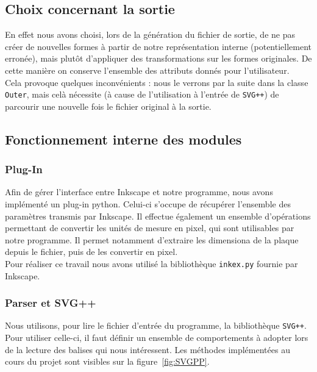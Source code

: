 \subsection{Choix concernant la sortie}

En effet nous avons choisi, lors de la génération du fichier de sortie, de ne pas créer de nouvelles formes à partir de notre représentation interne (potentiellement erronée), mais plutôt d'appliquer des transformations sur les formes originales. De cette manière on conserve l'ensemble des attributs donnés pour l'utilisateur.\\

Cela provoque quelques inconvénients : nous le verrons par la suite dans la classe \texttt{Outer}, mais celà nécessite (à cause de l'utilisation à l'entrée de \texttt{SVG++}) de parcourir une nouvelle fois le fichier original à la sortie.

\subsection{Fonctionnement interne des modules}

\subsubsection{Plug-In}

Afin de gérer l'interface entre Inkscape et notre programme, nous avons implémenté un plug-in python.
Celui-ci s'occupe de récupérer l'ensemble des paramètres transmis par Inkscape. Il effectue également un ensemble d'opérations permettant de convertir les unités de mesure en pixel, qui sont utilisables par notre programme. Il permet notamment d'extraire les dimensiona de la plaque depuis le fichier, puis de les convertir en pixel.\\
Pour réaliser ce travail nous avons utilisé la bibliothèque \texttt{inkex.py} fournie par Inkscape.\\



\subsubsection{Parser et SVG++}
Nous utilisons, pour lire le fichier d'entrée du programme, la bibliothèque \texttt{SVG++}.
Pour utiliser celle-ci, il faut définir un ensemble de comportements à adopter lors de la lecture des balises qui nous intéressent. Les méthodes implémentées au cours du projet sont visibles sur la figure~\ref{fig:SVGPP}.

